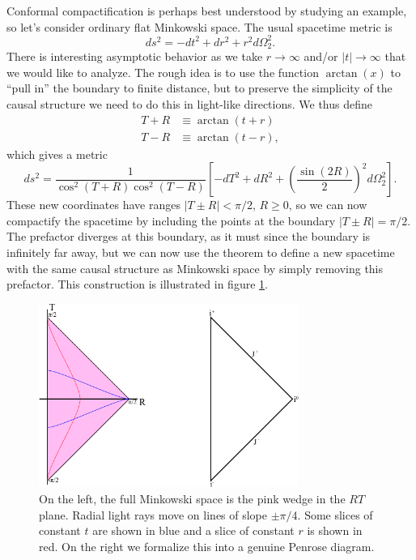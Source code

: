 \documentclass[12pt]{article}
\newcommand{\be}{\begin{equation}}
\newcommand{\ee}{\end{equation}}
\begin{document}
Conformal compactification is perhaps best understood by studying an example, so let's consider ordinary flat Minkowski space.  The usual spacetime metric is 
\be
ds^2=-dt^2+dr^2+r^2 d\Omega_2^2.  
\ee
There is interesting asymptotic behavior as we take $r\to\infty$ and/or $|t|\to \infty$ that we would like to analyze.  The rough idea is to use the function $\arctan(x)$ to ``pull in'' the boundary to finite distance, but to preserve the simplicity of the causal structure we need to do this in light-like directions. We thus define
\begin{align}\nonumber
T+R&\equiv \arctan (t+r)\\
T-R&\equiv \arctan(t-r),\label{comptran}
\end{align}
which gives a metric
\be\label{penrosemet}
ds^2=\frac{1}{\cos^2 (T+R)\cos^2(T-R)}\left[-dT^2+dR^2+\left(\frac{\sin (2R)}{2}\right)^2 d\Omega_2^2\right].
\ee
These new coordinates have ranges $|T\pm R|<\pi/2$, $R\geq 0$, so we can now compactify the spacetime by including the points at the boundary $|T\pm R|=\pi/2$.  The prefactor diverges at this boundary, as it must since the boundary is infinitely far away, but we can now use the theorem to define a new spacetime with the same causal structure as Minkowski space by simply removing this prefactor.  This construction is illustrated in figure \ref{flatpenrose}.
\begin{figure}
\begin{center}
\includegraphics[height=6cm]{flatpenrose.pdf}
\caption{On the left, the full Minkowski space is the pink wedge in the $RT$ plane.  Radial light rays move on lines of slope $\pm \pi/4$.  Some slices of constant $t$ are shown in blue and a slice of constant $r$ is shown in red.  On the right we formalize this into a genuine Penrose diagram.}\label{flatpenrose}
\end{center}
\end{figure}
\end{document}
